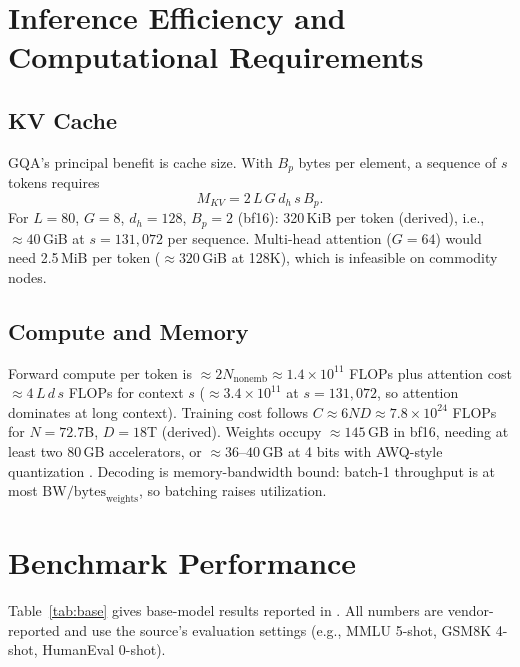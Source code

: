 \documentclass[conference]{IEEEtran}
\begin{document}
\section{Inference Efficiency and Computational Requirements}
\subsection{KV Cache}
GQA's principal benefit is cache size. With $B_p$ bytes per element, a sequence of $s$ tokens requires
\begin{equation}
M_{KV}=2\,L\,G\,d_h\,s\,B_p .
\end{equation}
For $L{=}80$, $G{=}8$, $d_h{=}128$, $B_p{=}2$ (bf16): 320\,KiB per token (derived), i.e., $\approx 40$\,GiB at $s{=}131{,}072$ per sequence. Multi-head attention ($G{=}64$) would need 2.5\,MiB per token ($\approx 320$\,GiB at 128K), which is infeasible on commodity nodes.

\subsection{Compute and Memory}
Forward compute per token is $\approx 2N_{\mathrm{nonemb}}\approx 1.4\times10^{11}$ FLOPs plus attention cost $\approx 4\,L\,d\,s$ FLOPs for context $s$ ($\approx 3.4\times10^{11}$ at $s{=}131{,}072$, so attention dominates at long context). Training cost follows $C\approx 6ND\approx 7.8\times10^{24}$ FLOPs for $N{=}72.7$B, $D{=}18$T (derived). Weights occupy $\approx 145$\,GB in bf16, needing at least two 80\,GB accelerators, or $\approx 36$--$40$\,GB at 4 bits with AWQ-style quantization \cite{awq}. Decoding is memory-bandwidth bound: batch-1 throughput is at most $\mathrm{BW}/\text{bytes}_{\mathrm{weights}}$, so batching raises utilization.

\section{Benchmark Performance}
Table~\ref{tab:base} gives base-model results reported in \cite{qwen25blog}. All numbers are vendor-reported and use the source's evaluation settings (e.g., MMLU 5-shot, GSM8K 4-shot, HumanEval 0-shot).
\end{document}
